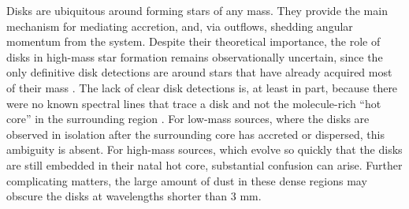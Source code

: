 \documentclass[twocolumn]{aastex62}
\newcommand{\sourcei}{SrcI\xspace}
\newcommand{\rlp}[1]{\textcolor{red!65!black}{\textbf{[RLP: #1]}}}
\begin{document}



Disks are ubiquitous around forming stars of any mass.  They provide the main
mechanism for mediating accretion, and, via outflows, shedding angular momentum
from the system.  Despite their theoretical importance, the role of disks in
high-mass star formation remains observationally uncertain, since the only
definitive disk detections are around stars that have already acquired most of
their mass \citep[e.g.,][]{Girart2017a}.  The lack of clear disk detections
is, at least in part, because there were no known spectral lines that trace a
disk and not the molecule-rich ``hot core'' in the surrounding region
\citep{Goddi2018a,Cesaroni2017a}.  For low-mass sources, where the disks are
observed in isolation after the surrounding core has accreted or dispersed,
this ambiguity is absent.  For high-mass sources, which evolve so quickly that
the disks are still embedded in their natal hot core, substantial confusion can
arise.  Further complicating matters, the large amount of dust in these dense
regions may obscure the disks at wavelengths shorter than 3 mm.
\end{document}
